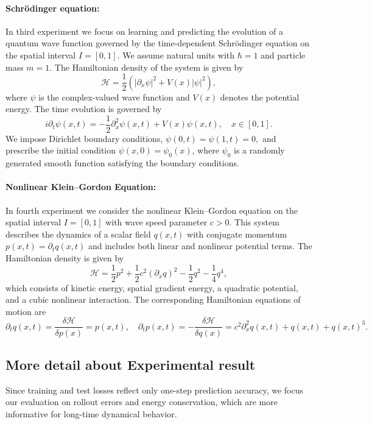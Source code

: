 \documentclass{article}
\theoremstyle{plain}
\theoremstyle{definition}
\theoremstyle{remark}
\begin{document}
\paragraph{Schr\"odinger equation:}
In third experiment we focus on learning and predicting the evolution of a quantum wave function
governed by the time-dependent Schr\"odinger equation on the spatial interval $I=[0,1]$.
We assume natural units with $\hbar=1$ and particle mass $m=1$.
The Hamiltonian density of the system is given by
\[
\mathcal{H} = \frac{1}{2}\left(|\partial_x \psi|^2 + V(x)|\psi|^2\right),
\]
where $\psi$ is the complex-valued wave function and $V(x)$ denotes the potential energy.
The time evolution is governed by
\[
i\partial_t \psi(x,t) = -\frac{1}{2}\partial_x^2\psi(x,t) + V(x)\psi(x,t),
\quad x\in[0,1].
\]
We impose Dirichlet boundary conditions,
\(
\psi(0,t)=\psi(1,t)=0,
\)
and prescribe the initial condition $\psi(x,0)=\psi_0(x)$, where $\psi_0$ is a randomly generated
smooth function satisfying the boundary conditions.

\paragraph{Nonlinear Klein--Gordon Equation:}In fourth experiment we consider the nonlinear Klein--Gordon equation on the spatial interval
$I=[0,1]$ with wave speed parameter $c>0$.
This system describes the dynamics of a scalar field $q(x,t)$ with conjugate momentum
$p(x,t)=\partial_t q(x,t)$ and includes both linear and nonlinear potential terms.
The Hamiltonian density is given by
\[
\mathcal{H}
= \frac{1}{2}p^2
+ \frac{1}{2}c^2(\partial_x q)^2
- \frac{1}{2}q^2
- \frac{1}{4}q^4,
\]
which consists of kinetic energy, spatial gradient energy, a quadratic potential,
and a cubic nonlinear interaction.
The corresponding Hamiltonian equations of motion are
\[
\partial_t q(x,t) = \dfrac{\delta \mathcal{H}}{\delta p(x)} = p(x,t), \quad
\partial_t p(x,t) = -\dfrac{\delta \mathcal{H}}{\delta q(x)}
= c^2\partial_x^2 q(x,t) + q(x,t) + q(x,t)^3.
\]



\subsection{More detail about Experimental result}
Since training and test losses reflect only one-step prediction accuracy,
we focus our evaluation on rollout errors and energy conservation,
which are more informative for long-time dynamical behavior.
\end{document}
